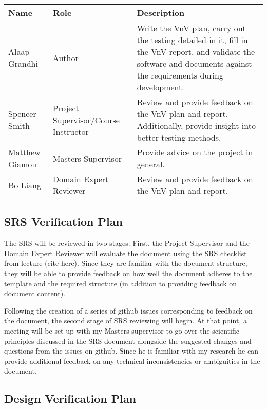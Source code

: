 \documentclass[12pt, titlepage]{article}
\begin{document}
\begin{table}[H]
  \centering
  \begin{tabular}{|p{3cm}|p{3cm}|p{6cm}|}
  \hline
  \textbf{Name} & \textbf{Role} & \textbf{Description} \\ \hline
  Alaap Grandhi & Author & Write the VnV plan, carry out the testing detailed in it, fill in the VnV report, and validate the software and documents against the requirements during development. \\ \hline
  Spencer Smith & Project Supervisor/Course Instructor & Review and provide feedback on the VnV plan and report. Additionally, provide insight into better testing methods. \\ \hline
  Matthew Giamou & Masters Supervisor & Provide advice on the project in general. \\ \hline
  Bo Liang & Domain Expert Reviewer & Review and provide feedback on the VnV plan and report. \\ \hline 

  \end{tabular}
\end{table}

\subsection{SRS Verification Plan}

The SRS will be reviewed in two stages. First, the Project Supervisor and the Domain
Expert Reviewer will evaluate the document using the SRS checklist from lecture (cite here).
Since they are familiar with the document structure, they will be able to provide feedback
on how well the document adheres to the template and the required structure (in addition to 
providing feedback on document content). 

Following the creation of a series of github issues corresponding 
to feedback on the document, the second stage of SRS reviewing will begin. At that point, a meeting 
will be set up with my Masters supervisor to go over the scientific principles discussed in the SRS document 
alongside the suggested changes and questions from the issues on github. Since he is familiar with 
my research he can provide additional feedback on any technical inconsistencies or ambiguities in the document.

\subsection{Design Verification Plan}
\end{document}
